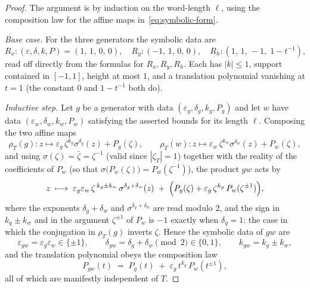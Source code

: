 \documentclass[11pt]{article}
\theoremstyle{plain}
\theoremstyle{definition}
\theoremstyle{remark}
\begin{document}
\begin{proof}
The argument is by induction on the word-length $\ell$, using the
composition law for the affine maps in~\eqref{eq:symbolic-form}.

\emph{Base case.} For the three generators the symbolic data are
\[
R_x \colon (\varepsilon,\delta,k,P) = (1,\,1,\,0,\,0),
\quad
R_y \colon (-1,\,1,\,0,\,0),
\quad
R_h \colon (1,\,1,\,-1,\; 1 - t^{-1}),
\]
read off directly from the formulas for $R_x, R_y, R_h$. Each has
$|k| \le 1$, support contained in $[-1,1]$, height at most $1$, and a
translation polynomial vanishing at $t = 1$ (the constant $0$ and
$1 - t^{-1}$ both do).

\emph{Inductive step.} Let $g$ be a generator with data
$(\varepsilon_g, \delta_g, k_g, P_g)$ and let $w$ have data
$(\varepsilon_w, \delta_w, k_w, P_w)$ satisfying the asserted bounds for
its length $\ell$. Composing the two affine maps
\[
\rho_T(g)\colon z \mapsto \varepsilon_g\,\zeta^{k_g}\sigma^{\delta_g}(z)
+ P_g(\zeta),
\qquad
\rho_T(w)\colon z \mapsto \varepsilon_w\,\zeta^{k_w}\sigma^{\delta_w}(z)
+ P_w(\zeta),
\]
and using $\sigma(\zeta) = \bar\zeta = \zeta^{-1}$ (valid since
$|\zeta_T| = 1$) together with the reality of the coefficients of $P_w$
(so that $\sigma\bigl(P_w(\zeta)\bigr) = P_w(\zeta^{-1})$), the product
$gw$ acts by
\[
z \;\longmapsto\;
\varepsilon_g\varepsilon_w\,\zeta^{\,k_g \pm k_w}\,
\sigma^{\delta_g + \delta_w}(z)
\;+\;
\Bigl(P_g(\zeta) + \varepsilon_g\,\zeta^{k_g}\,P_w(\zeta^{\pm 1})\Bigr),
\]
where the exponents $\delta_g + \delta_w$ and $\sigma^{\delta_g+\delta_w}$
are read modulo $2$, and the sign in $k_g \pm k_w$ and in the argument
$\zeta^{\pm 1}$ of $P_w$ is $-1$ exactly when $\delta_g = 1$: the case
in which the conjugation in $\rho_T(g)$ inverts $\zeta$. Hence the
symbolic data of $gw$ are
\[
\varepsilon_{gw} = \varepsilon_g\varepsilon_w \in \{\pm 1\},
\qquad
\delta_{gw} = \delta_g + \delta_w \pmod 2 \in \{0,1\},
\qquad
k_{gw} = k_g \pm k_w,
\]
and the translation polynomial obeys the composition law
\begin{equation}
\label{eq:composition-law}
P_{gw}(t) \;=\; P_g(t) \;+\; \varepsilon_g\, t^{k_g}\, P_w(t^{\pm 1}),
\end{equation}
all of which are manifestly independent of $T$.


\end{proof}
\end{document}
